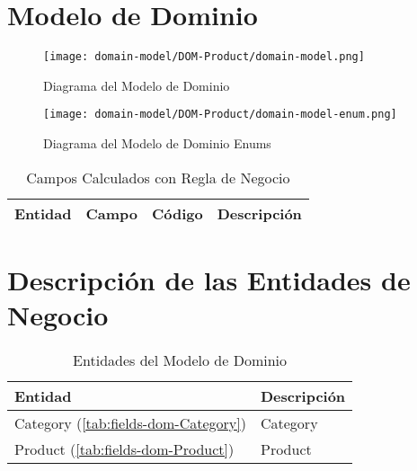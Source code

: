\clearpage
\section{Modelo de Dominio} \label{sec:dom-product}
\begin{figure}[H]
\begin{center}
	\label{tab:uml-domain-model}
	\texttt{[image: domain-model/DOM-Product/domain-model.png]}
	\caption{Diagrama del Modelo de Dominio}
\end{center}
\end{figure}
\begin{figure}[H]
		\begin{center}
			\label{tab:uml-domain-model}
			\texttt{[image: domain-model/DOM-Product/domain-model-enum.png]}
			\caption{Diagrama del Modelo de Dominio Enums}
		\end{center}
\end{figure}
\begin{table}[H]
			\caption{Campos Calculados con Regla de Negocio}
			\label{tab:entities}
			\begin{center}
			\begin{tabularx}{0.90\linewidth}{ X X X X}
				\hline
				\textbf{Entidad} & \textbf{Campo} & \textbf{C\'odigo} & \textbf{Descripci\'on} \\
				\hline
				\hline
			\end{tabularx}
			\end{center}
\end{table}

\clearpage
\section{Descripci\'on de las Entidades de Negocio} \label{sec:dom-entities-product}

\begin{table}[H]
	\caption{Entidades del Modelo de Dominio}
	\label{tab:entities}
	\begin{center}
	\begin{tabularx}{0.90\linewidth}{ X X }
		\hline
		\textbf{Entidad} & \textbf{Descripci\'on} \\
		\hline
		Category (\ref{tab:fields-dom-Category}) & Category \\
		Product (\ref{tab:fields-dom-Product}) & Product \\
		\hline
	\end{tabularx}
	\end{center}
\end{table}
